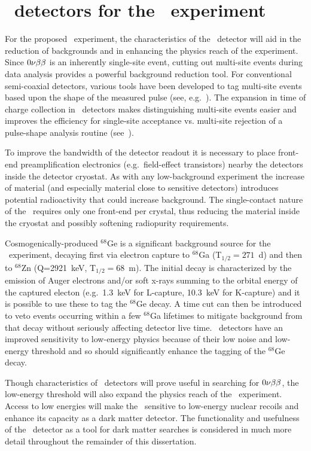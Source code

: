 	\section{\ppc~detectors for the \MJ~experiment}

For the proposed \MJ~experiment, the characteristics of the \ppc~detector
will aid in the reduction of backgrounds and in enhancing the physics reach of
the experiment.  Since $0 \nu \beta \beta$ is an inherently single-site event, cutting out
multi-site events during data analysis provides a powerful background reduction
tool.  For conventional semi-coaxial detectors, various tools have been developed
to tag multi-site events based upon the shape of the measured pulse (see,
e.g.~\cite{Aal00}).  The expansion in time
of charge collection in \ppc~detectors makes distinguishing multi-site events easier and improves the efficiency for single-site acceptance vs. multi-site rejection of a pulse-shape analysis routine (see~\cite{Budjas:2009zu,Ren10}).

To improve the bandwidth of the detector readout it is necessary to
place front-end preamplification electronics (e.g.~field-effect transistors) nearby the detectors
inside the detector cryostat.  As with any low-background 
experiment the increase of material (and especially material close to
sensitive detectors) introduces potential radioactivity that could
increase background.  The single-contact nature of the \ppc~requires only one
front-end per crystal, thus reducing the material inside the cryostat and possibly
softening radiopurity requirements.

Cosmogenically-produced $^{68}$Ge is a significant background
source for the \MJ~experiment, decaying first via electron capture to $^{68}$Ga
(T$_{1/2}=271$~d) and then to $^{68}$Zn (Q=2921~keV, T$_{1/2}=68$~m).  The
initial decay is characterized by the emission of Auger electrons and/or soft x-rays
summing to the orbital energy of the captured electon (e.g.~1.3~keV for L-capture, 10.3~keV for K-capture) 
and it is possible to use these to tag the $^{68}$Ge decay.  A time cut can then be introduced to veto events
occurring within a few $^{68}$Ga lifetimes to mitigate background from that
decay without seriously affecting detector live time.   \ppc~detectors have an
improved sensitivity to low-energy physics because of their low noise and 
low-energy threshold and so should significantly enhance the tagging of the
$^{68}$Ge decay.  

Though characteristics of \ppc~detectors will prove useful in searching for
$0 \nu \beta \beta$, the low-energy threshold will also
expand the physics reach of the \MJ~experiment.  Access to low energies will 
make the \minmod~sensitive to low-energy nuclear recoils and enhance its capacity as a dark matter
detector.  The functionality and usefulness of the \ppc~detector as a tool for dark
matter searches is considered in much more detail 
throughout the remainder of this dissertation.


